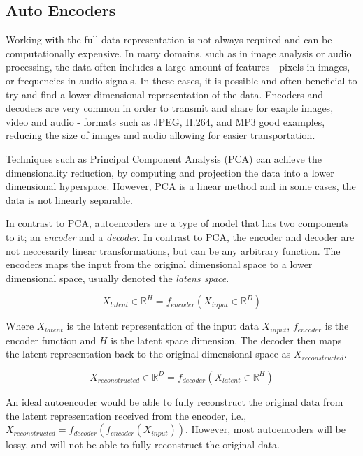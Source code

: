 \subsection{Auto Encoders}
Working with the full data representation is not always required and can be computationally expensive. In many domains, such as in image analysis or audio processing, the data often includes a large amount of features - pixels in images, or frequencies in audio signals. In these cases, it is possible and often beneficial to try and find a lower dimensional representation of the data. Encoders and decoders are very common in order to transmit and share for exaple images, video and audio - formats such as JPEG, H.264, and MP3 good examples, reducing the size of images and audio allowing for easier transportation.

Techniques such as Principal Component Analysis (PCA) can achieve the dimensionality reduction, by computing and projection the data into a lower dimensional hyperspace. However, PCA is a linear method and in some cases, the data is not linearly separable.

In contrast to PCA, autoencoders are a type of model that has two components to it; an \emph{encoder} and a \emph{decoder}. In contrast to PCA, the encoder and decoder are not neccesarily linear transformations, but can be any arbitrary function. The encoders maps the input from the original dimensional space to a lower dimensional space, usually denoted the \emph{latens space}.

$$
X_{latent} \in \mathbb{R}^H  = f_{encoder}(X_{input} \in \mathbb{R}^D)
$$

Where $X_{latent}$ is the latent representation of the input data $X_{input}$, $f_{encoder}$ is the encoder function and $H$ is the latent space dimension. The decoder then maps the latent representation back to the original dimensional space as $X_{reconstructed}$.

$$
X_{reconstructed} \in \mathbb{R}^D = f_{decoder}(X_{latent} \in \mathbb{R}^H)
$$

An ideal autoencoder would be able to fully reconstruct the original data from the latent representation received from the encoder, i.e., $X_{reconstructed} = f_{decoder}(f_{encoder}(X_{input}))$. However, most autoencoders will be lossy, and will not be able to fully reconstruct the original data.